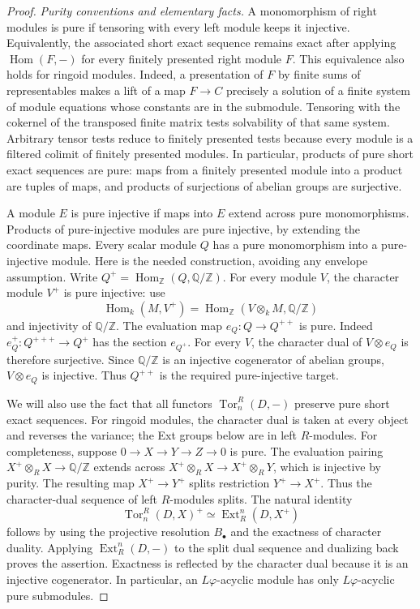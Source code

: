 \documentclass[11pt,a4paper]{article}
\theoremstyle{definition}\newtheorem{definition}[theorem]{Definition}
\theoremstyle{remark}\newtheorem{remark}[theorem]{Remark}
\begin{document}
\begin{proof}
\emph{Purity conventions and elementary facts.}
A monomorphism of right modules is pure if tensoring with every
left module keeps it injective. Equivalently, the associated short
exact sequence remains exact after applying $\operatorname{Hom}(F,-)$
for every finitely presented right module $F$.
This equivalence also holds for ringoid modules. Indeed, a presentation
of $F$ by finite sums of representables makes a lift of a map
$F\to C$ precisely a solution of a finite system of module equations
whose constants are in the submodule. Tensoring with the cokernel
of the transposed finite matrix tests solvability of that same system.
Arbitrary tensor tests reduce to finitely presented tests because
every module is a filtered colimit of finitely presented modules.
In particular, products of pure short exact sequences are pure:
maps from a finitely presented module into a product are tuples of
maps, and products of surjections of abelian groups are surjective.

A module $E$ is pure injective if maps into $E$ extend across pure
monomorphisms. Products of pure-injective modules are pure injective,
by extending the coordinate maps. Every scalar module $Q$ has a
pure monomorphism into a pure-injective module. Here is the needed
construction, avoiding any envelope assumption. Write
$Q^+=\operatorname{Hom}_{\mathbb Z}(Q,\mathbb Q/\mathbb Z)$.
For every module $V$, the character module $V^+$ is pure injective:
use
\[
 \operatorname{Hom}_k(M,V^+)
   =\operatorname{Hom}_{\mathbb Z}(V\otimes_k M,\mathbb Q/\mathbb Z)
\]
and injectivity of $\mathbb Q/\mathbb Z$.
The evaluation map $e_Q:Q\to Q^{++}$ is pure.
Indeed $e_Q^+:Q^{+++}\to Q^+$ has the section $e_{Q^+}$.
For every $V$, the character dual of $V\otimes e_Q$ is therefore
surjective. Since $\mathbb Q/\mathbb Z$ is an injective cogenerator
of abelian groups, $V\otimes e_Q$ is injective. Thus $Q^{++}$ is
the required pure-injective target.

We will also use the fact that all functors
$\operatorname{Tor}_n^R(D,-)$ preserve pure short exact sequences.
For ringoid modules, the character dual is taken at every object
and reverses the variance; the Ext groups below are in left
$R$-modules.
For completeness, suppose $0\to X\to Y\to Z\to0$ is pure.
The evaluation pairing
$X^+\otimes_R X\to\mathbb Q/\mathbb Z$ extends across
$X^+\otimes_R X\to X^+\otimes_R Y$, which is injective by purity.
The resulting map $X^+\to Y^+$ splits restriction
$Y^+\to X^+$. Thus the character-dual sequence of left
$R$-modules splits.
The natural identity
\[
 \operatorname{Tor}_n^R(D,X)^+
   \simeq \operatorname{Ext}_R^n(D,X^+)
 \tag{SM24.4}
\]
follows by using the projective resolution $B_\bullet$ and the
exactness of character duality.
Applying $\operatorname{Ext}_R^n(D,-)$ to the split dual sequence
and dualizing back proves the assertion. Exactness is reflected
by the character dual because it is an injective cogenerator.
In particular, an $L\varphi$-acyclic module has only
$L\varphi$-acyclic pure submodules.


\end{proof}
\end{document}
